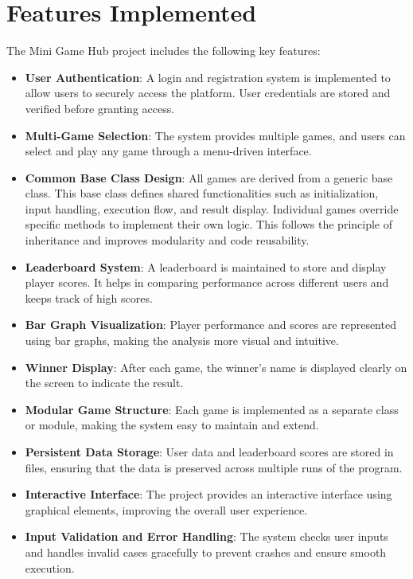 \documentclass{article}
\begin{document}
\section{Features Implemented}

The Mini Game Hub project includes the following key features:

\begin{itemize}

\item \textbf{User Authentication}: A login and registration system is implemented to allow users to securely access the platform. User credentials are stored and verified before granting access.

\item \textbf{Multi-Game Selection}: The system provides multiple games, and users can select and play any game through a menu-driven interface.

\item \textbf{Common Base Class Design}: All games are derived from a generic base class. This base class defines shared functionalities such as initialization, input handling, execution flow, and result display. Individual games override specific methods to implement their own logic. This follows the principle of inheritance and improves modularity and code reusability.

\item \textbf{Leaderboard System}: A leaderboard is maintained to store and display player scores. It helps in comparing performance across different users and keeps track of high scores.

\item \textbf{Bar Graph Visualization}: Player performance and scores are represented using bar graphs, making the analysis more visual and intuitive.

\item \textbf{Winner Display}: After each game, the winner’s name is displayed clearly on the screen to indicate the result.

\item \textbf{Modular Game Structure}: Each game is implemented as a separate class or module, making the system easy to maintain and extend.

\item \textbf{Persistent Data Storage}: User data and leaderboard scores are stored in files, ensuring that the data is preserved across multiple runs of the program.

\item \textbf{Interactive Interface}: The project provides an interactive interface using graphical elements, improving the overall user experience.

\item \textbf{Input Validation and Error Handling}: The system checks user inputs and handles invalid cases gracefully to prevent crashes and ensure smooth execution.

\end{itemize}
\end{document}
